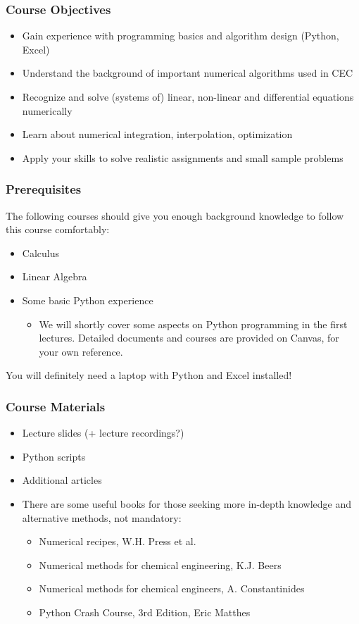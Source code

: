 \begin{frame}
 \frametitle{Course Objectives}
 \begin{itemize}
  \item Gain experience with programming basics and algorithm design (Python, Excel)
  \item Understand the background of important numerical algorithms used in CEC 
  \item Recognize and solve (systems of) linear, non-linear and differential equations numerically
  \item Learn about numerical integration, interpolation, optimization
  \item Apply your skills to solve realistic assignments and small sample problems
 \end{itemize}
\end{frame}

\begin{frame}
 \frametitle{Prerequisites}
  The following courses should give you enough background knowledge to follow this course comfortably:
 \begin{itemize}
   \item Calculus
   \item Linear Algebra
   \item Some basic Python experience
     \begin{itemize}
      \item We will shortly cover some aspects on Python programming in the first lectures. Detailed documents and courses are provided on Canvas, for your own reference.     
    \end{itemize}
  \end{itemize}
  You will definitely need a laptop with Python and Excel installed!
\end{frame}

\begin{frame}
 \frametitle{Course Materials}
 \begin{itemize}
  \item Lecture slides (+ lecture recordings?)
  \item Python scripts
  \item Additional articles
  \item There are some useful books for those seeking more in-depth knowledge and alternative methods, not mandatory:
  \begin{itemize}
    \item Numerical recipes, W.H. Press et al.
    \item Numerical methods for chemical engineering, K.J. Beers
    \item Numerical methods for chemical engineers, A. Constantinides
    \item Python Crash Course, 3rd Edition, Eric Matthes
  \end{itemize}
 \end{itemize}
\end{frame}

